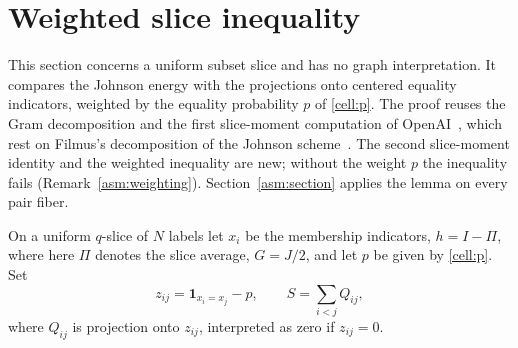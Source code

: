 \section{Weighted slice inequality}\label{sl:section}
This section concerns a uniform subset slice and has no graph interpretation.
It compares the Johnson energy with the projections onto centered equality
indicators, weighted by the equality probability $p$ of \eqref{cell:p}. The
proof reuses the Gram decomposition and the first slice-moment computation
of OpenAI~\cite[Lemma~6.1]{OAI26}, which rest on Filmus's decomposition of
the Johnson scheme~\cite[Lemmas~18 and~24]{Filmus16}. The second
slice-moment identity and the weighted inequality are new; without the weight
$p$ the inequality fails (Remark~\ref{asm:weighting}).
Section~\ref{asm:section} applies the lemma on every pair fiber.

On a uniform $q$-slice of $N$ labels let $x_i$ be the membership indicators,
$h=I-\Pi$, where here $\Pi$ denotes the slice average, $G=J/2$, and let $p$
be given by \eqref{cell:p}. Set
\[
 z_{ij}=\mathbf 1_{x_i=x_j}-p,\qquad
 S=\sum_{i<j}Q_{ij},
\]
where $Q_{ij}$ is projection onto $z_{ij}$, interpreted as zero if
$z_{ij}=0$.

